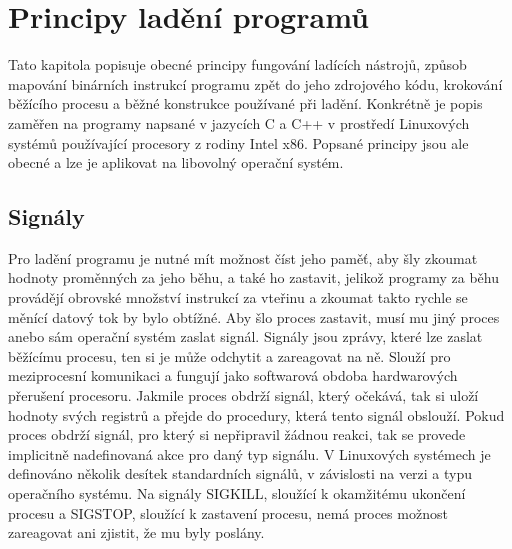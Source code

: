 \documentclass[bc,male,python,dept460]{diploma}						%
\begin{document}
\section{Principy ladění programů}
	Tato kapitola popisuje obecné principy fungování ladících nástrojů, způsob mapování binárních instrukcí programu zpět do jeho zdrojového kódu,
	krokování běžícího procesu a běžné konstrukce používané při ladění. Konkrétně je popis zaměřen na programy napsané v jazycích C a C++
	v prostředí Linuxových systémů používající procesory z rodiny Intel x86. %
	Popsané principy jsou ale obecné a lze je aplikovat na libovolný operační systém.
		
	\subsection{Signály}
		Pro ladění programu je nutné mít možnost číst jeho paměť, aby šly zkoumat hodnoty proměnných za jeho běhu, a také ho zastavit, jelikož
		programy za běhu provádějí obrovské množství instrukcí za vteřinu a zkoumat takto rychle se měnící datový tok by bylo obtížné.
		Aby šlo proces zastavit, musí mu jiný proces anebo sám operační systém zaslat signál.
		Signály jsou zprávy, které lze zaslat běžícímu procesu, ten si je může odchytit a zareagovat na ně.\cite[21]{tanenbaum}
		Slouží pro meziprocesní komunikaci a fungují jako softwarová obdoba hardwarových přerušení procesoru.
		Jakmile proces obdrží signál, který očekává, tak si uloží hodnoty svých registrů a přejde do procedury, která tento signál obslouží.
		Pokud proces obdrží signál, pro který si nepřipravil žádnou reakci, tak se provede implicitně nadefinovaná akce pro daný typ signálu.
		V Linuxových systémech je definováno několik desítek standardních signálů, v závislosti na verzi a typu operačního systému.
		Na signály SIGKILL, sloužící k okamžitému ukončení procesu a SIGSTOP, sloužící k zastavení procesu, nemá proces možnost zareagovat ani
		zjistit, že mu byly poslány.
	
\end{document}
